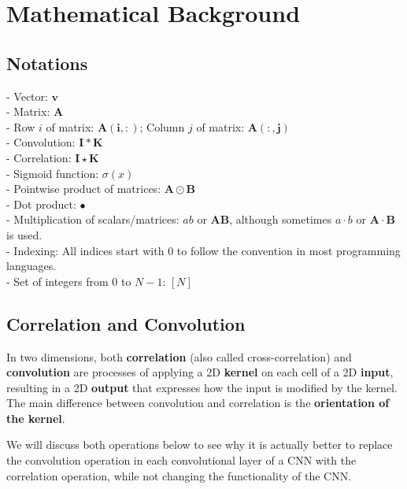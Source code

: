 \documentclass[12pt]{article}
\renewcommand{\vec}[1]{\mathbf{#1}}
\begin{document}
\section{Mathematical Background}
\subsection{Notations}
\noindent
- Vector: $\vec{v}$\\
- Matrix: $\bm{A}$\\
- Row $i$ of matrix: $\bm{A(i, :)}$; Column $j$ of matrix: $\bm{A(:, j)}$\\
- Convolution: $\bm{I} \ast \bm{K}$\\
- Correlation: $\bm{I} \star \bm{K}$\\
- Sigmoid function: $\sigma(x)$\\
- Pointwise product of matrices: $\bm{A} \odot \bm{B}$\\
- Dot product: $\bullet$\\
- Multiplication of scalars/matrices: $ab$ or $\bm{A}\bm{B}$, although sometimes $a \cdot b$ or $\bm{A}\cdot \bm{B}$ is used.\\
- Indexing: All indices start with 0 to follow the convention in most programming languages.\\
- Set of integers from $0$ to $N - 1$: $[N]$

\subsection{Correlation and Convolution}
In two dimensions, both \textbf{correlation} (also called cross-correlation) and \textbf{convolution} are processes of applying a 2D \textbf{kernel} on each cell of a 2D \textbf{input}, resulting in a 2D \textbf{output} that expresses how the input is modified by the kernel. The main difference between convolution and correlation is the \textbf{orientation of the kernel}.

We will discuss both operations below to see why it is actually better to replace the convolution operation in each convolutional layer of a CNN with the correlation operation, while not changing the functionality of the CNN.
\end{document}
